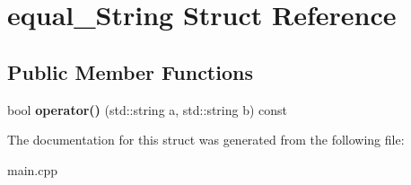 \hypertarget{structequal__String}{}\section{equal\+\_\+\+String Struct Reference}
\label{structequal__String}
\subsection*{Public Member Functions}
\begin{DoxyCompactItemize}
\item 
\mbox{\label{structequal__String_aa8eae470ceb5b64ebd5ec75f742736fe}} 
bool {\bfseries operator()} (std\+::string a, std\+::string b) const
\end{DoxyCompactItemize}


The documentation for this struct was generated from the following file\+:\begin{DoxyCompactItemize}
\item 
main.\+cpp\end{DoxyCompactItemize}
